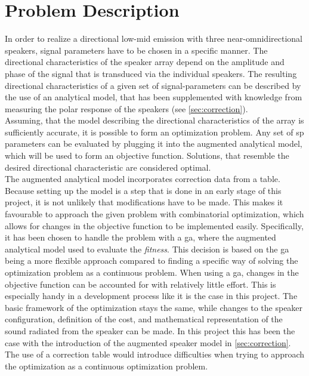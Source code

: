 \section{Problem Description}
In order to realize a directional low-mid emission with three near-omnidirectional speakers, signal parameters have to be chosen in a specific manner. The directional characteristics of the speaker array depend on the amplitude and phase of the signal that is transduced via the individual speakers. The resulting directional characteristics of a given set of signal-parameters can be described by the use of an analytical model, that has been supplemented with knowledge from measuring the polar response of the speakers (see \autoref{sec:correction}).\\
Assuming, that the model describing the directional characteristics of the array is sufficiently accurate, it is possible to form an optimization problem. Any set of \gls{sp} parameters can be evaluated by plugging it into the augmented analytical model, which will be used to form an objective function. Solutions, that resemble the desired directional characteristic are considered optimal.\\
The augmented analytical model incorporates correction data from a table. Because setting up the model is a step that is done in an early stage of this project, it is not unlikely that modifications have to be made.  This makes it favourable to approach the given problem with combinatorial optimization, which allows for changes in the objective function to be implemented easily. Specifically, it has been chosen to handle the problem with a \gls{ga}, where the augmented analytical model used to evaluate the \textit{fitness}.
This decision is based on the \gls{ga} being a more flexible approach compared to finding a specific way of solving the optimization problem as a continuous problem. When using a \gls{ga}, changes in the objective function can be accounted for with relatively little effort. This is especially handy in a development process like it is the case in this project. The basic framework of the optimization stays the same, while changes to the speaker configuration, definition of the cost, and mathematical representation of the sound radiated from the speaker can be made. In this project this has been the case with the introduction of the augmented speaker model in \autoref{sec:correction}. The use of a correction table would introduce difficulties when trying to approach the optimization as a continuous optimization problem.

